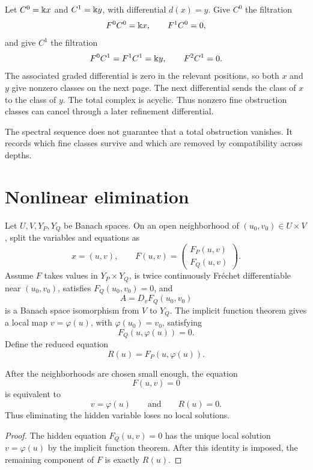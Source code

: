 \begin{example}\label{ex:spectral_cancellation}
Let $C^0=\Bbbk x$ and $C^1=\Bbbk y$, with differential $d(x)=y$.  Give $C^0$ the filtration
\[
F^0C^0=\Bbbk x,
\qquad
F^1C^0=0,
\]
and give $C^1$ the filtration
\[
F^0C^1=F^1C^1=\Bbbk y,
\qquad
F^2C^1=0.
\]
The associated graded differential is zero in the relevant positions, so both $x$ and $y$ give nonzero classes on the next page.  The next differential sends the class of $x$ to the class of $y$.  The total complex is acyclic.  Thus nonzero fine obstruction classes can cancel through a later refinement differential.
\end{example}

\begin{remark}\label{rem:spectral_sequence_meaning}
The spectral sequence does not guarantee that a total obstruction vanishes.  It records which fine classes survive and which are removed by compatibility across depths.
\end{remark}

\section{Nonlinear elimination}\label{sec:nonlinear_elimination}

Let $U,V,Y_P,Y_Q$ be Banach spaces. On an open neighborhood of $(u_0,v_0)\in U\times V$, split the variables and equations as
\[
x=(u,v),
\qquad
F(u,v)=
\begin{pmatrix}
F_P(u,v)\\
F_Q(u,v)
\end{pmatrix}.
\]
Assume $F$ takes values in $Y_P\times Y_Q$, is twice continuously Fr\'echet differentiable near $(u_0,v_0)$, satisfies $F_Q(u_0,v_0)=0$, and
\[
A=D_vF_Q(u_0,v_0)
\]
is a Banach space isomorphism from $V$ to $Y_Q$. The implicit function theorem gives a local map $v=\varphi(u)$, with $\varphi(u_0)=v_0$, satisfying
\[
F_Q(u,\varphi(u))=0.
\]
Define the reduced equation
\[
R(u)=F_P(u,\varphi(u)).
\]

\begin{theorem}\label{thm:exact_local_elimination}
After the neighborhoods are chosen small enough, the equation
\[
F(u,v)=0
\]
is equivalent to
\[
v=\varphi(u)
\qquad\text{and}\qquad
R(u)=0.
\]
Thus eliminating the hidden variable loses no local solutions.
\end{theorem}

\begin{proof}
The hidden equation $F_Q(u,v)=0$ has the unique local solution $v=\varphi(u)$ by the implicit function theorem.  After this identity is imposed, the remaining component of $F$ is exactly $R(u)$.
\end{proof}

